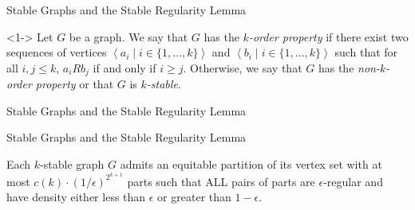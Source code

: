 \documentclass{beamer}
\newcommand{\parcurly}[1]{\{ #1 \}}
\newcommand{\Partriangle}[1]{\left< #1 \right>}
\begin{document}
\begin{frame}{Stable Graphs and the Stable Regularity Lemma}
    \begin{definition}<1-> \label{def:k_order_property}
        Let $G$ be a graph.
        We say that $G$ has the \emph{$k$-order property} if there exist two sequences of vertices
        $\Partriangle{a_i \mid i \in \parcurly{1, \dots, k}}$ and $\Partriangle{b_i \mid i \in \parcurly{1, \dots, k}}$ such that
        for all $i,j \leq k$, $a_i R b_j$ if and only if $i \geq j$.
        Otherwise, we say that $G$ has the \emph{non-$k$-order property} or that $G$ is \emph{$k$-stable}.
    \end{definition}

\end{frame}

\begin{frame}{Stable Graphs and the Stable Regularity Lemma}
    
\end{frame}

\begin{frame}{Stable Graphs and the Stable Regularity Lemma}
    \begin{theorem} \label{thm:B}
        Each $k$-stable graph $G$ admits an equitable partition of its vertex set with at most
        ${c(k)\cdot(1/\epsilon)^{2^{k+1}}}$ parts such that ALL pairs of parts
        are $\epsilon$-regular and have density either less than $\epsilon$ or greater than $1 - \epsilon$.
    \end{theorem}
\end{frame}

\end{document}
